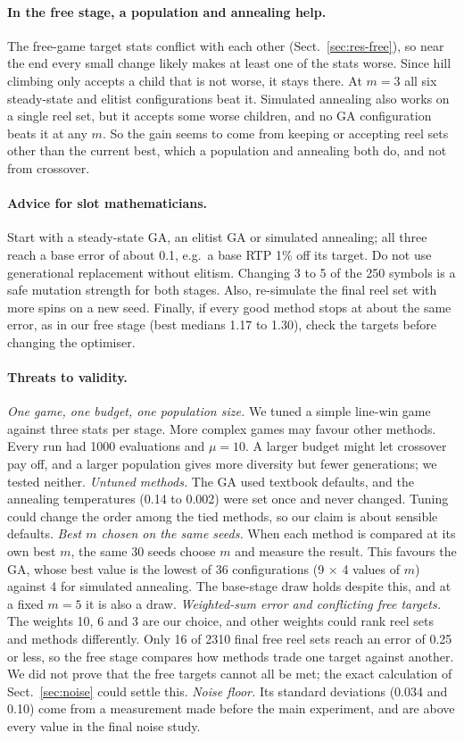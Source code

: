 \paragraph{In the free stage, a population and annealing help.} The free-game target stats conflict with each other (Sect.~\ref{sec:res-free}), so near the end every small change likely makes at least one of the stats worse. Since hill climbing only accepts a child that is not worse, it stays there. At $m = 3$ all six steady-state and elitist configurations beat it. Simulated annealing also works on a single reel set, but it accepts some worse children, and no GA configuration beats it at any $m$. So the gain seems to come from keeping or accepting reel sets other than the current best, which a population and annealing both do, and not from crossover.

\paragraph{Advice for slot mathematicians.} Start with a steady-state GA, an elitist GA or simulated annealing; all three reach a base error of about 0.1, e.g.\ a base RTP 1\% off its target. Do not use generational replacement without elitism. Changing 3 to 5 of the 250 symbols is a safe mutation strength for both stages. Also, re-simulate the final reel set with more spins on a new seed. Finally, if every good method stops at about the same error, as in our free stage (best medians 1.17 to 1.30), check the targets before changing the optimiser.

\paragraph{Threats to validity.} \emph{One game, one budget, one population size.} We tuned a simple line-win game against three stats per stage. More complex games may favour other methods. Every run had 1000 evaluations and $\mu = 10$. A larger budget might let crossover pay off, and a larger population gives more diversity but fewer generations; we tested neither. \emph{Untuned methods.} The GA used textbook defaults, and the annealing temperatures (0.14 to 0.002) were set once and never changed. Tuning could change the order among the tied methods, so our claim is about sensible defaults. \emph{Best $m$ chosen on the same seeds.} When each method is compared at its own best $m$, the same 30 seeds choose $m$ and measure the result. This favours the GA, whose best value is the lowest of 36 configurations (9 $\times$ 4 values of $m$) against 4 for simulated annealing. The base-stage draw holds despite this, and at a fixed $m = 5$ it is also a draw. \emph{Weighted-sum error and conflicting free targets.} The weights 10, 6 and 3 are our choice, and other weights could rank reel sets and methods differently. Only 16 of 2310 final free reel sets reach an error of 0.25 or less, so the free stage compares how methods trade one target against another. We did not prove that the free targets cannot all be met; the exact calculation of Sect.~\ref{sec:noise} could settle this. \emph{Noise floor.} Its standard deviations (0.034 and 0.10) come from a measurement made before the main experiment, and are above every value in the final noise study.